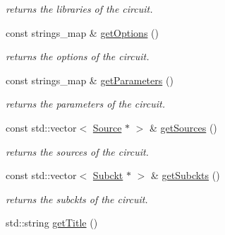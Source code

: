 \begin{DoxyCompactItemize}
\begin{DoxyCompactList}\small\item\em returns the libraries of the circuit. \end{DoxyCompactList}\item 
\hypertarget{class_s_p_i_c_e_1_1_circuit_a4ee11ef79ef893c5621e0e7d26a7f9a7}{const strings\-\_\-map \& \hyperlink{class_s_p_i_c_e_1_1_circuit_a4ee11ef79ef893c5621e0e7d26a7f9a7}{get\-Options} ()}\label{class_s_p_i_c_e_1_1_circuit_a4ee11ef79ef893c5621e0e7d26a7f9a7}

\begin{DoxyCompactList}\small\item\em returns the options of the circuit. \end{DoxyCompactList}\item 
\hypertarget{class_s_p_i_c_e_1_1_circuit_a4c46676f9ead2db537a0dd963b4f08f1}{const strings\-\_\-map \& \hyperlink{class_s_p_i_c_e_1_1_circuit_a4c46676f9ead2db537a0dd963b4f08f1}{get\-Parameters} ()}\label{class_s_p_i_c_e_1_1_circuit_a4c46676f9ead2db537a0dd963b4f08f1}

\begin{DoxyCompactList}\small\item\em returns the parameters of the circuit. \end{DoxyCompactList}\item 
\hypertarget{class_s_p_i_c_e_1_1_circuit_ac18caa525ed386c44874ee643c88e27b}{const std\-::vector$<$ \hyperlink{class_s_p_i_c_e_1_1_source}{Source} $\ast$ $>$ \& \hyperlink{class_s_p_i_c_e_1_1_circuit_ac18caa525ed386c44874ee643c88e27b}{get\-Sources} ()}\label{class_s_p_i_c_e_1_1_circuit_ac18caa525ed386c44874ee643c88e27b}

\begin{DoxyCompactList}\small\item\em returns the sources of the circuit. \end{DoxyCompactList}\item 
\hypertarget{class_s_p_i_c_e_1_1_circuit_adcc4ca0de68f8ee05f0d5db3b7604930}{const std\-::vector$<$ \hyperlink{class_s_p_i_c_e_1_1_subckt}{Subckt} $\ast$ $>$ \& \hyperlink{class_s_p_i_c_e_1_1_circuit_adcc4ca0de68f8ee05f0d5db3b7604930}{get\-Subckts} ()}\label{class_s_p_i_c_e_1_1_circuit_adcc4ca0de68f8ee05f0d5db3b7604930}

\begin{DoxyCompactList}\small\item\em returns the subckts of the circuit. \end{DoxyCompactList}\item 
\hypertarget{class_s_p_i_c_e_1_1_circuit_ad19721dd878c04c854a72af12d785741}{std\-::string \hyperlink{class_s_p_i_c_e_1_1_circuit_ad19721dd878c04c854a72af12d785741}{get\-Title} ()}\label{class_s_p_i_c_e_1_1_circuit_ad19721dd878c04c854a72af12d785741}


\end{DoxyCompactItemize}
